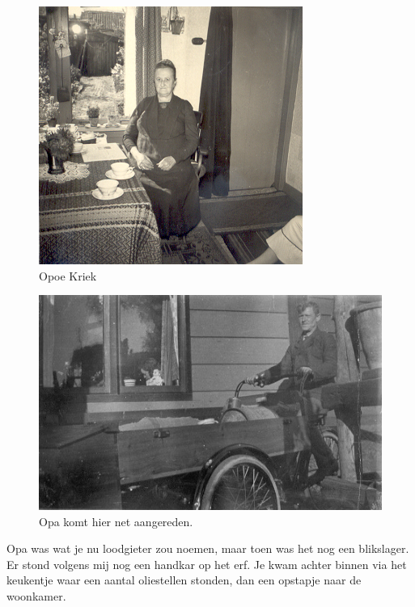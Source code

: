\documentclass[12pt,twoside, openright]{memoir}
\begin{document}
\begin{figure}
\centering
\includegraphics[width=\textwidth]{img/ch3/opoekriek}
\caption*{\footnotesize Opoe Kriek}
\end{figure}

\begin{figure}
\centering
\includegraphics[width=\textwidth]{img/ch3/opakriek2}
\caption*{\footnotesize Opa komt hier net aangereden.}
\end{figure}

Opa was wat je nu loodgieter zou noemen, maar toen was het nog een blikslager. Er stond volgens mij nog een handkar op het erf. Je kwam achter binnen via het keukentje waar een aantal oliestellen stonden, dan een opstapje naar de woonkamer. 
\end{document}
